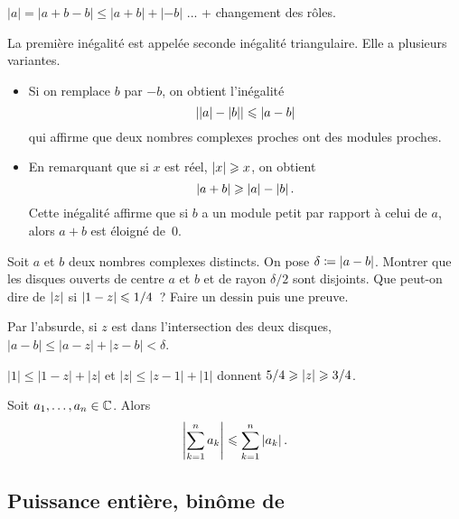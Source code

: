 \documentclass{magnolia}
\begin{document}
\begin{preuve}
$|a|=|a+b-b|\leq |a+b|+|-b|$ ... + changement des rôles.

\end{preuve}

\begin{remarqueUnique}
\remarque La première inégalité est appelée seconde inégalité triangulaire.
  Elle a plusieurs variantes.
  \begin{itemize}
  \item Si on remplace $b$ par $-b$, on obtient l'inégalité
    \[\left|\left|a\right|-\left|b\right|\right|\leqslant\left|a-b\right|\]
    qui affirme que deux nombres complexes proches ont des modules proches.
  \item En remarquant que si $x$ est réel, $\left|x\right|\geqslant x$, on obtient
    \[\left|a+b\right|\geqslant\left|a\right|-\left|b\right|.\]
    Cette inégalité affirme que si $b$ a un module petit par rapport à celui de $a$, alors $a+b$ est éloigné de~0.
  \end{itemize}
\end{remarqueUnique}

\begin{exos}
\exo Soit $a$ et $b$ deux nombres complexes distincts. On pose $\delta\coloneqq\left|a-b\right|$. Montrer que les disques ouverts de centre $a$ et $b$ et de rayon $\delta/2$ sont disjoints.
\exo Que peut-on dire de $\left|z\right|$ si $\left|1-z\right|\leqslant 1/4$~? Faire un dessin puis une preuve.
\begin{sol}
Par l'absurde, si $z$ est dans l'intersection des deux disques, $|a-b|\leq|a-z|+|z-b|<\delta$.

$|1|\leq |1-z|+|z|$ et $|z|\leq |z-1|+|1|$ donnent $5/4\geqslant \left|z\right|\geqslant 3/4$.
\end{sol}
\end{exos}

\begin{proposition}
Soit $a_1,\ldots,a_n\in\mathbb{C}$. Alors
\[\left|\sum_{k=1}^n a_k\right|\leqslant \sum_{k=1}^n \left|a_k\right|.\]
\end{proposition}


\subsection{Puissance entière, binôme de }
\end{document}
